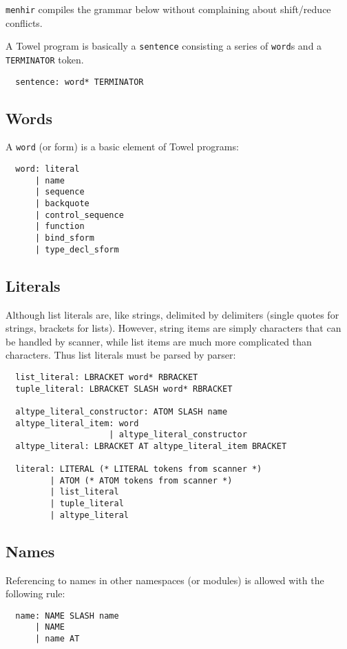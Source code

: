 \documentclass{article}
\begin{document}
\texttt{menhir} compiles the grammar below without complaining about shift/reduce conflicts.

A Towel program is basically a \texttt{sentence} consisting a series of \texttt{word}s and a \texttt{TERMINATOR} token.
\begin{verbatim}
  sentence: word* TERMINATOR
\end{verbatim}

\subsection{Words}
\label{ssec:words}

A \texttt{word} (or form) is a basic element of Towel programs:
\begin{verbatim}
  word: literal
      | name
      | sequence
      | backquote
      | control_sequence
      | function
      | bind_sform
      | type_decl_sform
\end{verbatim}

\subsection{Literals}

Although list literals are, like strings, delimited by delimiters (single quotes for strings, brackets for lists). However, string items are simply characters that can be handled by scanner, while list items are much more complicated than characters. Thus list literals must be parsed by parser:
\begin{verbatim}
  list_literal: LBRACKET word* RBRACKET
  tuple_literal: LBRACKET SLASH word* RBRACKET

  altype_literal_constructor: ATOM SLASH name
  altype_literal_item: word
                     | altype_literal_constructor
  altype_literal: LBRACKET AT altype_literal_item BRACKET

  literal: LITERAL (* LITERAL tokens from scanner *)
         | ATOM (* ATOM tokens from scanner *)
         | list_literal
         | tuple_literal
         | altype_literal
\end{verbatim}

\subsection{Names}

Referencing to names in other namespaces (or modules) is allowed with the following rule:
\begin{verbatim}
  name: NAME SLASH name
      | NAME
      | name AT
\end{verbatim}
\end{document}

